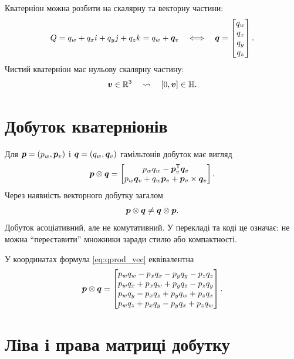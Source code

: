Кватерніон можна розбити на скалярну та векторну частини:
\begin{equation}
Q=q_w+q_x i+q_y j+q_z k
  =q_w+\bm{q}_v
  \quad\Longleftrightarrow\quad
\bm{q}=\begin{bmatrix}q_w\\q_x\\q_y\\q_z\end{bmatrix}.
\end{equation}
Чистий кватерніон має нульову скалярну частину:
\begin{equation}
\bm{v}\in\mathbb{R}^3
\quad\leadsto\quad
[0,\bm{v}]\in\mathbb{H} .
\end{equation}

\section{Добуток кватерніонів}

Для $\bm{p}=(p_w,\bm{p}_v)$ і $\bm{q}=(q_w,\bm{q}_v)$ гамільтонів добуток має вигляд
\begin{equation}\label{eq:qprod_vec}
\bm{p}\otimes\bm{q}
=
\begin{bmatrix}
p_wq_w-\bm{p}_v^{\mathsf{T}}\bm{q}_v\\
p_w\bm{q}_v+q_w\bm{p}_v+\bm{p}_v\times\bm{q}_v
\end{bmatrix}.
\end{equation}
Через наявність векторного добутку загалом
\begin{equation}
\bm{p}\otimes\bm{q}\ne \bm{q}\otimes\bm{p}.
\end{equation}
Добуток асоціативний, але не комутативний. У перекладі та коді це означає: не можна ``переставити'' множники заради стилю або компактності.

У координатах формула \eqref{eq:qprod_vec} еквівалентна
\begin{equation}\label{eq:qprod_coords}
\bm{p}\otimes\bm{q}
=
\begin{bmatrix}
p_wq_w-p_xq_x-p_yq_y-p_zq_z\\
p_wq_x+p_xq_w+p_yq_z-p_zq_y\\
p_wq_y-p_xq_z+p_yq_w+p_zq_x\\
p_wq_z+p_xq_y-p_yq_x+p_zq_w
\end{bmatrix}.
\end{equation}

\section{Ліва і права матриці добутку}

